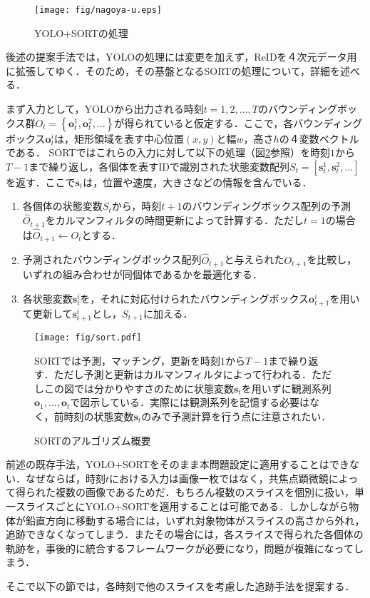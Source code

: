 \begin{figure}[t]
    \centering    
    \texttt{[image: fig/nagoya-u.eps]}
    \caption{YOLO+SORTの処理}
    \label{fig:yolosort}
\end{figure}

後述の提案手法では，YOLOの処理には変更を加えず，ReIDを４次元データ用に拡張してゆく．そのため，その基盤となるSORTの処理について，詳細を述べる．
\par
まず入力として，YOLOから出力される時刻$t=1,2,...,T$のバウンディングボックス群$O_t = \left\{\bm{o}_t^1, \bm{o}_t^2,...\right\}$が得られていると仮定する．ここで，各バウンディングボックス$\bm{o}_t^i$は，矩形領域を表す中心位置$(x,y)$と幅$w$，高さ$h$の４変数ベクトルである． SORTではこれらの入力に対して以下の処理（図\ref{fig:sort}参照）を時刻$1$から$T-1$まで繰り返し，各個体を表すIDで識別された状態変数配列$S_t = \left[\bm{s}_t^1, \bm{s}_t^2,...\right]$を返す．ここで$\bm{s}_t$は，位置や速度，大きさなどの情報を含んでいる．

\begin{enumerate}
    \item 各個体の状態変数$S_t$から，時刻$t+1$のバウンディングボックス配列の予測$\hat{O}_{t+1}$をカルマンフィルタ\cite{adachi2012kalman}の時間更新によって計算する．ただし$t=1$の場合は$\hat{O}_{t+1} \leftarrow O_t$とする．
    \item 予測されたバウンディングボックス配列$\hat{O}_{t+1}$と与えられた$O_{t+1}$を比較し，いずれの組み合わせが同個体であるかを最適化する．
    \item 各状態変数$\bm{s}_t^i$を，それに対応付けられたバウンディングボックス$\bm{o}_{t+1}^i$を用いて更新して$\bm{s}_{t+1}^i$とし，$S_{t+1}$に加える．
\end{enumerate}

\begin{figure}[t]
    \centering    
    \texttt{[image: fig/sort.pdf]}
    \caption{SORTのアルゴリズム概要}
    \small
    SORTでは予測，マッチング，更新を時刻$1$から$T-1$まで繰り返す．ただし予測と更新はカルマンフィルタによって行われる．ただしこの図では分かりやすさのために状態変数$\bm{s}_t$を用いずに観測系列$\bm{o}_1,...,\bm{o}_t$で図示している．実際には観測系列を記憶する必要はなく，前時刻の状態変数$\bm{s}_t$のみで予測計算を行う点に注意されたい．
    \label{fig:sort}
\end{figure}

前述の既存手法，YOLO+SORTをそのまま本問題設定に適用することはできない．なぜならば，時刻$t$における入力は画像一枚ではなく，共焦点顕微鏡によって得られた複数の画像であるためだ．もちろん複数のスライスを個別に扱い，単一スライスごとにYOLO+SORTを適用することは可能である．しかしながら物体が鉛直方向に移動する場合には，いずれ対象物体がスライスの高さから外れ，追跡できなくなってしまう．またその場合には，各スライスで得られた各個体の軌跡を，事後的に統合するフレームワークが必要になり，問題が複雑になってしまう．
\par
そこで以下の節では，各時刻で他のスライスを考慮した追跡手法を提案する．

